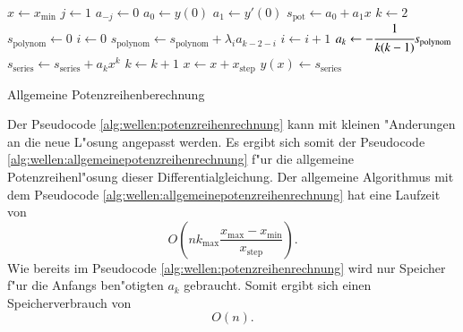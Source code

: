 \begin{algorithm}
	\begin{algorithmic}[1]
		\State $x \gets x_{\text{min}}$
			\State $j \gets 1$
				\State $a_{-j} \gets 0$
			\EndFor
			\State $a_0 \gets y(0)$
			\State $a_1 \gets y'(0)$
			\State $s_{\text{pot}} \gets a_0 + a_1x$
			\State $k \gets 2$
				\State $s_{\text{polynom}} \gets 0$
				\State $i \gets 0$
					\State $s_{\text{polynom}} \gets 
					s_{\text{polynom}}+\lambda_i a_{k-2-i}$
					\State $i \gets i + 1$
				\EndFor
				\State $a_k \gets -\cfrac{1}{k(k-1)} s_{\text{polynom}}$
				\State $s_{\text{series}} \gets s_{\text{series}} + 
				a_k x^k$
				\State $k \gets k + 1$
			\EndFor
		\State $x \gets x + x_{\text{step}}$
		\State $y(x) \gets s_{\text{series}}$
		\EndFor
	\end{algorithmic}
	
	\caption{Allgemeine Potenzreihenberechnung} 
	\label{alg:wellen:allgemeinepotenzreihenrechnung}
\end{algorithm}

Der Pseudocode \ref{alg:wellen:potenzreihenrechnung} kann mit kleinen 
"Anderungen an die neue L"osung angepasst werden. Es ergibt sich somit der 
Pseudocode \ref{alg:wellen:allgemeinepotenzreihenrechnung} f"ur die allgemeine 
Potenzreihenl"osung dieser Differentialgleichung. Der allgemeine Algorithmus 
mit dem Pseudocode \ref{alg:wellen:allgemeinepotenzreihenrechnung} hat eine 
Laufzeit von
\begin{equation*}
	O
	\left(
		nk_{\text{max}}\frac{x_{\text{max}}-x_{\text{min}}}{x_{\text{step}}}
	\right).
\end{equation*}
Wie bereits im Pseudocode \ref{alg:wellen:potenzreihenrechnung} wird nur 
Speicher f"ur die Anfangs ben"otigten $a_k$ gebraucht. Somit ergibt sich einen 
Speicherverbrauch von
\begin{equation*}
	O
	\left(
		n
	\right).
\end{equation*}